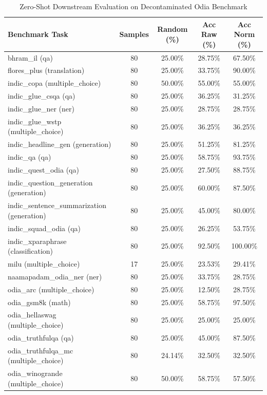 \begin{table}[ht]
\centering
\caption{Zero-Shot Downstream Evaluation on Decontaminated Odia Benchmark}
\begin{tabular}{lcccc}
\hline
\textbf{Benchmark Task} & \textbf{Samples} & \textbf{Random (\%)} & \textbf{Acc Raw (\%)} & \textbf{Acc Norm (\%)} \\
\hline
bhram\_il (qa) & 80 & 25.00\% & 28.75\% & 67.50\% \\
flores\_plus (translation) & 80 & 25.00\% & 33.75\% & 90.00\% \\
indic\_copa (multiple\_choice) & 80 & 50.00\% & 55.00\% & 55.00\% \\
indic\_glue\_csqa (qa) & 80 & 25.00\% & 36.25\% & 31.25\% \\
indic\_glue\_ner (ner) & 80 & 25.00\% & 28.75\% & 28.75\% \\
indic\_glue\_wstp (multiple\_choice) & 80 & 25.00\% & 36.25\% & 36.25\% \\
indic\_headline\_gen (generation) & 80 & 25.00\% & 51.25\% & 81.25\% \\
indic\_qa (qa) & 80 & 25.00\% & 58.75\% & 93.75\% \\
indic\_quest\_odia (qa) & 80 & 25.00\% & 27.50\% & 88.75\% \\
indic\_question\_generation (generation) & 80 & 25.00\% & 60.00\% & 87.50\% \\
indic\_sentence\_summarization (generation) & 80 & 25.00\% & 45.00\% & 80.00\% \\
indic\_squad\_odia (qa) & 80 & 25.00\% & 26.25\% & 53.75\% \\
indic\_xparaphrase (classification) & 80 & 25.00\% & 92.50\% & 100.00\% \\
milu (multiple\_choice) & 17 & 25.00\% & 23.53\% & 29.41\% \\
naamapadam\_odia\_ner (ner) & 80 & 25.00\% & 33.75\% & 28.75\% \\
odia\_arc (multiple\_choice) & 80 & 25.00\% & 12.50\% & 28.75\% \\
odia\_gsm8k (math) & 80 & 25.00\% & 58.75\% & 97.50\% \\
odia\_hellaswag (multiple\_choice) & 80 & 25.00\% & 25.00\% & 25.00\% \\
odia\_truthfulqa (qa) & 80 & 25.00\% & 45.00\% & 87.50\% \\
odia\_truthfulqa\_mc (multiple\_choice) & 80 & 24.14\% & 32.50\% & 32.50\% \\
odia\_winogrande (multiple\_choice) & 80 & 50.00\% & 58.75\% & 57.50\% \\

\end{tabular}
\end{table}
